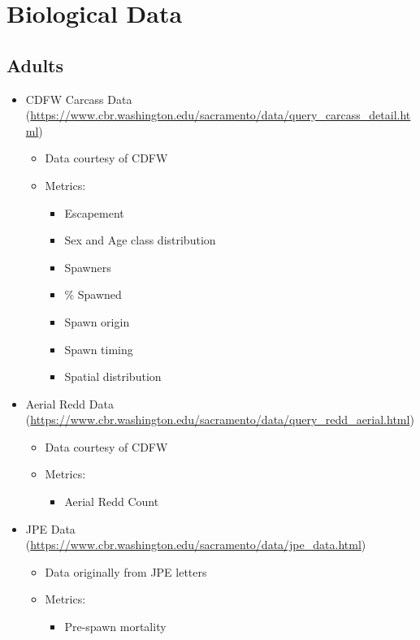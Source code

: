 \documentclass[
]{book}
\providecommand{\tightlist}{%
  \setlength{\itemsep}{0pt}\setlength{\parskip}{0pt}}
\theoremstyle{definition}
\theoremstyle{definition}
\theoremstyle{definition}
\theoremstyle{definition}
\theoremstyle{remark}
\begin{document}
\hypertarget{biological-data}{%
\section{Biological Data}\label{biological-data}}

\hypertarget{adults-1}{%
\subsection{Adults}\label{adults-1}}

\begin{itemize}
\tightlist
\item
  CDFW Carcass Data (\url{https://www.cbr.washington.edu/sacramento/data/query_carcass_detail.html})

  \begin{itemize}
  \tightlist
  \item
    Data courtesy of CDFW
  \item
    Metrics:

    \begin{itemize}
    \tightlist
    \item
      Escapement
    \item
      Sex and Age class distribution
    \item
      Spawners
    \item
      \% Spawned
    \item
      Spawn origin
    \item
      Spawn timing
    \item
      Spatial distribution
    \end{itemize}
  \end{itemize}
\item
  Aerial Redd Data (\url{https://www.cbr.washington.edu/sacramento/data/query_redd_aerial.html})

  \begin{itemize}
  \tightlist
  \item
    Data courtesy of CDFW
  \item
    Metrics:

    \begin{itemize}
    \tightlist
    \item
      Aerial Redd Count
    \end{itemize}
  \end{itemize}
\item
  JPE Data (\url{https://www.cbr.washington.edu/sacramento/data/jpe_data.html})

  \begin{itemize}
  \tightlist
  \item
    Data originally from JPE letters
  \item
    Metrics:

    \begin{itemize}
    \tightlist
    \item
      Pre-spawn mortality
    \end{itemize}
  \end{itemize}
\end{itemize}
\end{document}
